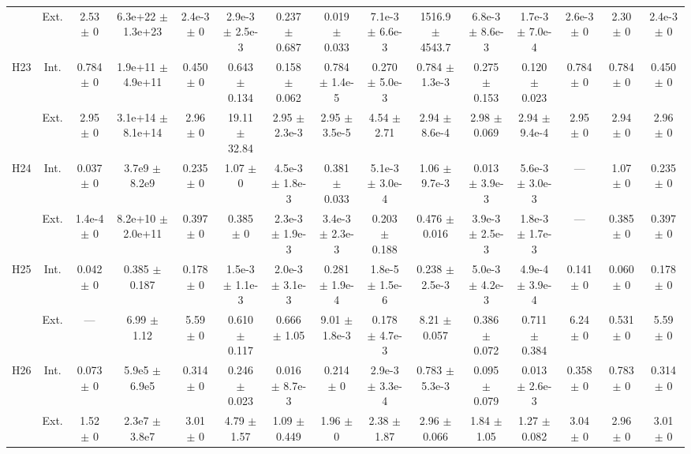 \begin{table}[htbp]
{\begin{tabular}{@{}ccccccccccccccc@{}}
 & Ext. & 2.53 $\pm$ 0 & 6.3e+22 $\pm$ 1.3e+23 & 2.4e-3 $\pm$ 0 & 2.9e-3 $\pm$ 2.5e-3 & 0.237 $\pm$ 0.687 & 0.019 $\pm$ 0.033 & 7.1e-3 $\pm$ 6.6e-3 & 1516.9 $\pm$ 4543.7 & 6.8e-3 $\pm$ 8.6e-3 & 1.7e-3 $\pm$ 7.0e-4 & 2.6e-3 $\pm$ 0 & 2.30 $\pm$ 0 & 2.4e-3 $\pm$ 0 \\
\cline{2-15}
\multirow{2}{*}{H23} & Int. & 0.784 $\pm$ 0 & 1.9e+11 $\pm$ 4.9e+11 & 0.450 $\pm$ 0 & 0.643 $\pm$ 0.134 & 0.158 $\pm$ 0.062 & 0.784 $\pm$ 1.4e-5 & 0.270 $\pm$ 5.0e-3 & 0.784 $\pm$ 1.3e-3 & 0.275 $\pm$ 0.153 & 0.120 $\pm$ 0.023 & 0.784 $\pm$ 0 & 0.784 $\pm$ 0 & 0.450 $\pm$ 0 \\
 & Ext. & 2.95 $\pm$ 0 & 3.1e+14 $\pm$ 8.1e+14 & 2.96 $\pm$ 0 & 19.11 $\pm$ 32.84 & 2.95 $\pm$ 2.3e-3 & 2.95 $\pm$ 3.5e-5 & 4.54 $\pm$ 2.71 & 2.94 $\pm$ 8.6e-4 & 2.98 $\pm$ 0.069 & 2.94 $\pm$ 9.4e-4 & 2.95 $\pm$ 0 & 2.94 $\pm$ 0 & 2.96 $\pm$ 0 \\
\cline{2-15}
\multirow{2}{*}{H24} & Int. & 0.037 $\pm$ 0 & 3.7e9 $\pm$ 8.2e9 & 0.235 $\pm$ 0 & 1.07 $\pm$ 0 & 4.5e-3 $\pm$ 1.8e-3 & 0.381 $\pm$ 0.033 & 5.1e-3 $\pm$ 3.0e-4 & 1.06 $\pm$ 9.7e-3 & 0.013 $\pm$ 3.9e-3 & 5.6e-3 $\pm$ 3.0e-3 & --- & 1.07 $\pm$ 0 & 0.235 $\pm$ 0 \\
 & Ext. & 1.4e-4 $\pm$ 0 & 8.2e+10 $\pm$ 2.0e+11 & 0.397 $\pm$ 0 & 0.385 $\pm$ 0 & 2.3e-3 $\pm$ 1.9e-3 & 3.4e-3 $\pm$ 2.3e-3 & 0.203 $\pm$ 0.188 & 0.476 $\pm$ 0.016 & 3.9e-3 $\pm$ 2.5e-3 & 1.8e-3 $\pm$ 1.7e-3 & --- & 0.385 $\pm$ 0 & 0.397 $\pm$ 0 \\
\cline{2-15}
\multirow{2}{*}{H25} & Int. & 0.042 $\pm$ 0 & 0.385 $\pm$ 0.187 & 0.178 $\pm$ 0 & 1.5e-3 $\pm$ 1.1e-3 & 2.0e-3 $\pm$ 3.1e-3 & 0.281 $\pm$ 1.9e-4 & 1.8e-5 $\pm$ 1.5e-6 & 0.238 $\pm$ 2.5e-3 & 5.0e-3 $\pm$ 4.2e-3 & 4.9e-4 $\pm$ 3.9e-4 & 0.141 $\pm$ 0 & 0.060 $\pm$ 0 & 0.178 $\pm$ 0 \\
 & Ext. & --- & 6.99 $\pm$ 1.12 & 5.59 $\pm$ 0 & 0.610 $\pm$ 0.117 & 0.666 $\pm$ 1.05 & 9.01 $\pm$ 1.8e-3 & 0.178 $\pm$ 4.7e-3 & 8.21 $\pm$ 0.057 & 0.386 $\pm$ 0.072 & 0.711 $\pm$ 0.384 & 6.24 $\pm$ 0 & 0.531 $\pm$ 0 & 5.59 $\pm$ 0 \\
\cline{2-15}
\multirow{2}{*}{H26} & Int. & 0.073 $\pm$ 0 & 5.9e5 $\pm$ 6.9e5 & 0.314 $\pm$ 0 & 0.246 $\pm$ 0.023 & 0.016 $\pm$ 8.7e-3 & 0.214 $\pm$ 0 & 2.9e-3 $\pm$ 3.3e-4 & 0.783 $\pm$ 5.3e-3 & 0.095 $\pm$ 0.079 & 0.013 $\pm$ 2.6e-3 & 0.358 $\pm$ 0 & 0.783 $\pm$ 0 & 0.314 $\pm$ 0 \\
 & Ext. & 1.52 $\pm$ 0 & 2.3e7 $\pm$ 3.8e7 & 3.01 $\pm$ 0 & 4.79 $\pm$ 1.57 & 1.09 $\pm$ 0.449 & 1.96 $\pm$ 0 & 2.38 $\pm$ 1.87 & 2.96 $\pm$ 0.066 & 1.84 $\pm$ 1.05 & 1.27 $\pm$ 0.082 & 3.04 $\pm$ 0 & 2.96 $\pm$ 0 & 3.01 $\pm$ 0 \\

\end{tabular}}
\end{table}
